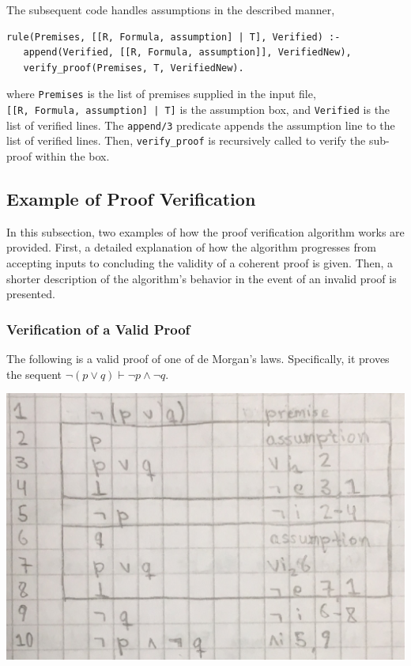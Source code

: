\documentclass[a4paper, 11pt]{article}
\begin{document}
   The subsequent code handles assumptions in the described
   manner,

\begin{verbatim}
rule(Premises, [[R, Formula, assumption] | T], Verified) :-
   append(Verified, [[R, Formula, assumption]], VerifiedNew),
   verify_proof(Premises, T, VerifiedNew).
\end{verbatim}
   
   where \texttt{Premises} is the list of premises supplied 
   in the input file, \\ 
   \texttt{[[R, Formula, assumption] | T]} is the assumption
   box, and \texttt{Verified} is the list of verified lines.
   The \texttt{append/3} predicate appends the assumption line
   to the list of verified lines. Then, \texttt{verify\_proof}
   is recursively called to verify the sub-proof within the
   box.

   \subsection{Example of Proof Verification}

   In this subsection, two examples of how the proof
   verification algorithm works are provided. First, a
   detailed explanation of how the algorithm progresses from
   accepting inputs to concluding the validity of a coherent 
   proof is given. Then, a shorter description of the 
   algorithm's behavior in the event of an invalid proof is 
   presented.
   
   \subsubsection{Verification of a Valid Proof}

   The following is a valid proof of one of de Morgan's laws.
   Specifically, it proves the sequent 
   $\neg(p \vee q) \vdash \neg p \wedge \neg q$.
   \bigbreak

   \includegraphics[scale=0.25]{de-morgan-valid}
   
\end{document}
